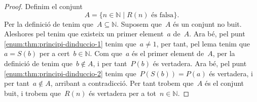 \documentclass[../fonaments-de-les-matematiques.tex]{subfiles}
\begin{document}
    \begin{proof}
        Definim el conjunt
        \[
            A=\{n\in\mathbb{N}\mid R(n)\text{ és falsa}\}.
        \]
        Per la definició de  tenim que~\(A\subseteq\mathbb{N}\).
        Suposem que~\(A\) és un conjunt no buit.
        Aleshores pel  tenim que existeix un primer element~\(a\) de~\(A\).
        Ara bé, pel punt \eqref{enum:thm:principi-dinduccio-1} tenim que~\(a\neq1\), per tant, pel lema  tenim que~\(a=S(b)\) per a cert~\(b\in\mathbb{N}\).
        Com que~\(a\) és el primer element de~\(A\), per la definició de  tenim que~\(b\notin A\), i per tant~\(P(b)\) és vertadera.
        Ara bé, pel punt \eqref{enum:thm:principi-dinduccio-2} tenim que~\(P(S(b))=P(a)\) és vertadera, i per tant~\(a\notin A\), arribant a contradicció.
        Per tant trobem que~\(A\) és el conjunt buit, i trobem que~\(R(n)\) és vertadera per a tot~\(n\in\mathbb{N}\).
    \end{proof}
\end{document}
